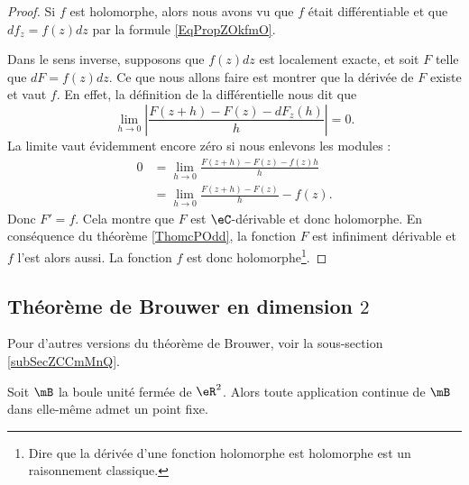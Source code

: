 \begin{proof}
    Si \( f\) est holomorphe, alors nous avons vu que \( f\) était différentiable et que \( df_{z}=f(z)dz\) par la formule \ref{EqPropZOkfmO}.

    Dans le sens inverse, supposons que \( f(z)dz\) est localement exacte, et soit \( F\) telle que \( dF=f(z)dz\). Ce que nous allons faire est montrer que la dérivée de \( F\) existe et vaut \( f\). En effet, la définition de la différentielle nous dit que
    \begin{equation}
        \lim_{h\to 0} \left| \frac{ F(z+h)-F(z)-dF_z(h) }{ h } \right| =0.
    \end{equation}
    La limite vaut évidemment encore zéro si nous enlevons les modules :
    \begin{subequations}
        \begin{align}
            0&=\lim_{h\to 0} \frac{ F(z+h)-F(z)-f(z)h }{ h }\\
            &=\lim_{h\to 0} \frac{ F(z+h)-F(z) }{ h }-f(z).
        \end{align}
    \end{subequations}
    Donc \( F'=f\). Cela montre que \( F\) est \( \eC\)-dérivable et donc holomorphe. En conséquence du théorème \ref{ThomcPOdd}, la fonction \( F\) est infiniment dérivable et \( f\) l'est alors aussi. La fonction \( f\) est donc holomorphe\footnote{Dire que la dérivée d'une fonction holomorphe est holomorphe est un raisonnement classique.}.
\end{proof}

\subsection{Théorème de Brouwer en dimension \texorpdfstring{$ 2$}{2}}
Pour d'autres versions du théorème de Brouwer, voir la sous-section \ref{subSecZCCmMnQ}.

\begin{theorem}     \label{ThoLVViheK}
    Soit \( \mB\) la boule unité fermée de \( \eR^2\). Alors toute application continue de \( \mB\) dans elle-même admet un point fixe.
\end{theorem}

